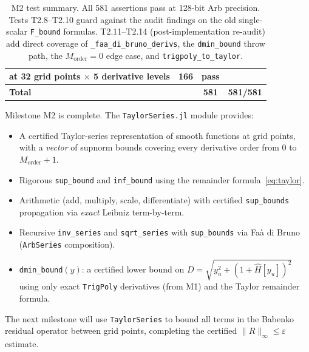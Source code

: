 \documentclass[11pt]{article}
\theoremstyle{definition}
\begin{document}
\begin{table}[H]
\begin{tabular}{llcc}
        at 32 grid points $\times$ 5 derivative levels & 166 & \textcolor{green!60!black}{\textbf{pass}} \\
\midrule
\textbf{Total} & & \textbf{581} & \textcolor{green!60!black}{\textbf{581/581}} \\
\bottomrule
\end{tabular}
\caption{M2 test summary. All 581 assertions pass at 128-bit Arb precision.
Tests T2.8--T2.10 guard against the audit findings on the old single-scalar
\texttt{F\_bound} formulas. T2.11--T2.14 (post-implementation re-audit) add
direct coverage of \texttt{\_faa\_di\_bruno\_derivs}, the \texttt{dmin\_bound}
throw path, the $M_{\mathrm{order}} = 0$ edge case, and \texttt{trigpoly\_to\_taylor}.}
\end{table}

Milestone M2 is complete. The \texttt{TaylorSeries.jl} module provides:
\begin{itemize}
  \item A certified Taylor-series representation of smooth functions at grid
        points, with a \emph{vector} of supnorm bounds covering every derivative
        order from $0$ to $M_{\mathrm{order}}+1$.
  \item Rigorous \texttt{sup\_bound} and \texttt{inf\_bound} using the remainder
        formula~\eqref{eq:taylor}.
  \item Arithmetic (add, multiply, scale, differentiate) with certified
        \texttt{sup\_bounds} propagation via \emph{exact} Leibniz term-by-term.
  \item Recursive \texttt{inv\_series} and \texttt{sqrt\_series} with
        \texttt{sup\_bounds} via Fa\`a di Bruno (\texttt{ArbSeries} composition).
  \item \texttt{dmin\_bound}$(y)$: a certified lower bound on
        $D = \sqrt{y_u^2 + (1 + \hat H[y_u])^2}$ using only exact
        \texttt{TrigPoly} derivatives (from M1) and the Taylor remainder
        formula.
\end{itemize}

The next milestone will use \texttt{TaylorSeries} to bound all terms in the
Babenko residual operator between grid points, completing the certified
$\|R\|_\infty \le \varepsilon$ estimate.
\end{document}
